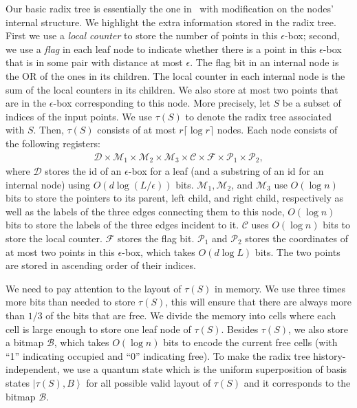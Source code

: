 \documentclass[10pt,a4paper]{article}
\newcommand{\ket}[1]{\left| #1 \right\rangle}
\newcommand{\ceil}[1]{\lceil #1 \rceil}
\begin{document}
Our basic radix tree is essentially the one in~\cite{r11,r28} with modification on the nodes' internal structure. We highlight the extra information stored in the radix tree.
First we use a \emph{local counter} to store the number of points in this $\epsilon$-box; second, we use a \emph{flag} in each leaf node to indicate whether there is a point in this $\epsilon$-box that is in some pair with distance at most $\epsilon$. The flag bit in an internal node is the $\mathrm{OR}$ of the ones in its children. The local counter in each internal node is the sum of the local counters in its children. We also store at most two points that are in the $\epsilon$-box corresponding to this node. More precisely, let $S$ be a subset of indices of the input points. We use $\tau(S)$ to denote the radix tree associated with $S$.
Then, $\tau(S)$ consists of at most $r\ceil{\log r}$ nodes. Each node consists of the following registers:
\begin{align}
  \mathcal{D} \times \mathcal{M}_1 \times \mathcal{M}_2 \times \mathcal{M}_3 \times \mathcal{C} \times \mathcal{F} \times \mathcal{P}_1 \times \mathcal{P}_2,
\end{align}
where $\mathcal{D}$ stores the id of an $\epsilon$-box for a leaf (and a substring of an id for an internal node) using $O(d\log(L/\epsilon))$ bits. $\mathcal{M}_1, \mathcal{M}_2$, and $\mathcal{M}_3$ use $O(\log n)$ bits to store the pointers to its parent, left child, and right child, respectively as well as the labels of the three edges connecting them to this node, $O(\log n)$ bits to store the labels of the three edges incident to it. $\mathcal{C}$ uses $O(\log n)$ bits to store the local counter. $\mathcal{F}$ stores the flag bit. $\mathcal{P}_1$ and $\mathcal{P}_2$ stores the coordinates of at most two points in this $\epsilon$-box, which takes $O(d\log L)$ bits. The two points are stored in ascending order of their indices.

We need to pay attention to the layout of $\tau(S)$ in memory. We use three times more bits than needed to store $\tau(S)$, this will ensure that there are always more than $1/3$ of the bits that are free. We divide the memory into cells where each cell is large enough to store one leaf node of $\tau(S)$. Besides $\tau(S)$, we also store a bitmap $\mathcal{B}$, which takes $O(\log n)$ bits to encode the current free cells (with ``1'' indicating occupied and ``0'' indicating free). To make the radix tree history-independent, we use a quantum state which is the uniform superposition of basis states $\ket{\tau(S), B}$ for all possible valid layout of $\tau(S)$ and it corresponds to the bitmap $\mathcal{B}$.
\end{document}
